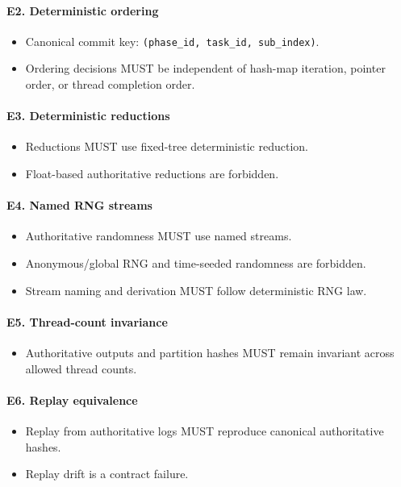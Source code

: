 \documentclass[9pt,a4paper,openany]{book}
\begin{document}
\paragraph{E2. Deterministic ordering}
\begin{itemize}
\item Canonical commit key: \texttt{(phase\_\allowbreak{}id, task\_\allowbreak{}id, sub\_\allowbreak{}index)}.\allowbreak{}
\item Ordering decisions MUST be independent of hash-\allowbreak{}map iteration, pointer order, or thread completion order.\allowbreak{}
\end{itemize}

\paragraph{E3. Deterministic reductions}
\begin{itemize}
\item Reductions MUST use fixed-\allowbreak{}tree deterministic reduction.\allowbreak{}
\item Float-\allowbreak{}based authoritative reductions are forbidden.\allowbreak{}
\end{itemize}

\paragraph{E4. Named RNG streams}
\begin{itemize}
\item Authoritative randomness MUST use named streams.\allowbreak{}
\item Anonymous/\allowbreak{}global RNG and time-\allowbreak{}seeded randomness are forbidden.\allowbreak{}
\item Stream naming and derivation MUST follow deterministic RNG law.\allowbreak{}
\end{itemize}

\paragraph{E5. Thread-count invariance}
\begin{itemize}
\item Authoritative outputs and partition hashes MUST remain invariant across allowed thread counts.\allowbreak{}
\end{itemize}

\paragraph{E6. Replay equivalence}
\begin{itemize}
\item Replay from authoritative logs MUST reproduce canonical authoritative hashes.\allowbreak{}
\item Replay drift is a contract failure.\allowbreak{}
\end{itemize}
\end{document}
